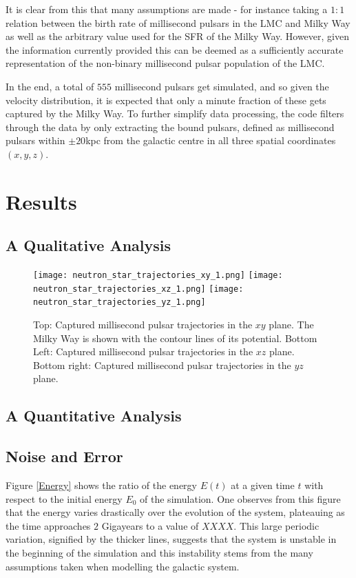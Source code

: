 It is clear from this that many assumptions are made - for instance taking a $1:1$ relation between the birth rate of millisecond pulsars in the LMC and Milky Way as well as the arbitrary value used for the SFR of the Milky Way. However, given the information currently provided this can be deemed as a sufficiently accurate representation of the non-binary millisecond pulsar population of the LMC.

In the end, a total of $555$ millisecond pulsars get simulated, and so given the velocity distribution, it is expected that only a minute fraction of these gets captured by the Milky Way. To further simplify data processing, the code filters through the data by only extracting the bound pulsars, defined as millisecond pulsars within $\pm 20$kpc from the galactic centre in all three spatial coordinates $(x, y, z)$.



\newpage
\section{Results}\label{Results and Discussion}
\setcounter{figure}{0} 
\subsection{A Qualitative Analysis}\label{Qualitative}

\begin{figure}[H]
\centering
\texttt{[image: neutron\_star\_trajectories\_xy\_1.png]}
\texttt{[image: neutron\_star\_trajectories\_xz\_1.png]}
\texttt{[image: neutron\_star\_trajectories\_yz\_1.png]}
\caption{Top: Captured millisecond pulsar trajectories in the $xy$ plane. The Milky Way is shown with the contour lines of its potential. Bottom Left: Captured millisecond pulsar trajectories in the $xz$ plane. Bottom right: Captured millisecond pulsar trajectories in the $yz$ plane.}
\label{PersistenceErwanComp}
\end{figure}


\subsection{A Quantitative Analysis}\label{Quantitative}

\subsection{Noise and Error}

Figure \ref{Energy} shows the ratio of the energy $E(t)$ at a given time $t$ with respect to the initial energy $E_0$ of the simulation. One observes from this figure that the energy varies drastically over the evolution of the system, plateauing as the time approaches $2$ Gigayears to a value of $XXXX$. This large periodic variation, signified by the thicker lines, suggests that the system is unstable in the beginning of the simulation and this instability stems from the many assumptions taken when modelling the galactic system. 

